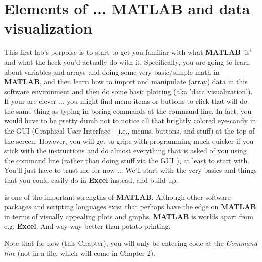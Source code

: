 \documentclass{tufte-book} %
\begin{document}
\chapter{Elements of ... MATLAB and data visualization}
\label{ch:01}


\begin{fullwidth}

 This first lab's porpoise is to start to get you familiar with what \textbf{MATLAB} 'is' and what the heck you'd actually do with it. Specifically, you are going to learn about variables and arrays and  doing some very basic/simple math in \textbf{MATLAB}, and then learn how to import and manipulate (array) data in this software environment and then do some basic plotting (aka 'data visualization'). If your are clever ... you might find menu items or buttons to click that will do the same thing as typing in boring commands at the command line. In fact, you would have to be pretty dumb not to notice all that brightly colored eye-candy in the GUI (Graphical User Interface -- i.e., menus, buttons, and stuff) at the top of  the screen. However, you will get to grips with programming much quicker if you stick with the instructions and do almost everything that is asked of you using the command line  (rather than doing stuff via the GUI ), at least to start with. You'll just have to trust me for now ... We'll start with the very basics and things that you could easily do in \textbf{Excel} instead, and build up.

 is one of the important strengths of \textbf{MATLAB}. Although other software packages and scripting languages exist that perhaps have the edge on \textbf{MATLAB} in terms of visually appealing plots and graphs, \textbf{MATLAB} is worlds apart from e.g. \textbf{Excel}. And way way better than potato printing.

\vspace{4mm}
\noindent Note that for now (this Chapter), you will only be entering code at the \textit{Command line} (not in a file, which will come in Chapter 2).

\end{fullwidth}


\newpage

\end{document}

